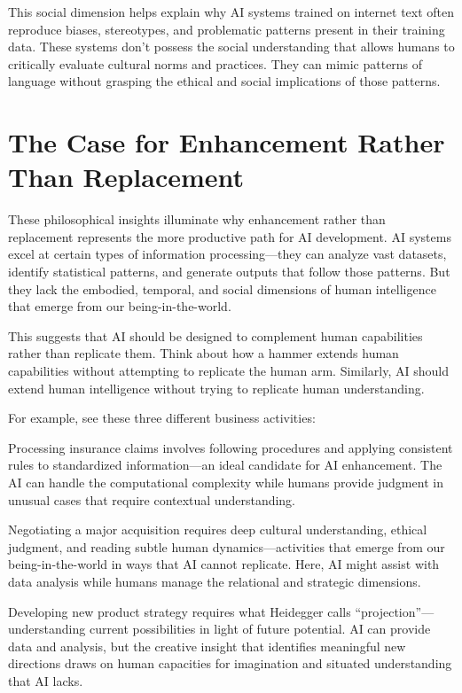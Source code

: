 \documentclass[
  Letterpaper,
]{scrbook}
\begin{document}
This social dimension helps explain why AI systems trained on internet
text often reproduce biases, stereotypes, and problematic patterns
present in their training data. These systems don't possess the social
understanding that allows humans to critically evaluate cultural norms
and practices. They can mimic patterns of language without grasping the
ethical and social implications of those patterns.

\section{The Case for Enhancement Rather Than
Replacement}\label{the-case-for-enhancement-rather-than-replacement}

These philosophical insights illuminate why enhancement rather than
replacement represents the more productive path for AI development. AI
systems excel at certain types of information processing---they can
analyze vast datasets, identify statistical patterns, and generate
outputs that follow those patterns. But they lack the embodied,
temporal, and social dimensions of human intelligence that emerge from
our being-in-the-world.

This suggests that AI should be designed to complement human
capabilities rather than replicate them. Think about how a hammer
extends human capabilities without attempting to replicate the human
arm. Similarly, AI should extend human intelligence without trying to
replicate human understanding.

For example, see these three different business activities:

Processing insurance claims involves following procedures and applying
consistent rules to standardized information---an ideal candidate for AI
enhancement. The AI can handle the computational complexity while humans
provide judgment in unusual cases that require contextual understanding.

Negotiating a major acquisition requires deep cultural understanding,
ethical judgment, and reading subtle human dynamics---activities that
emerge from our being-in-the-world in ways that AI cannot replicate.
Here, AI might assist with data analysis while humans manage the
relational and strategic dimensions.

Developing new product strategy requires what Heidegger calls
``projection''---understanding current possibilities in light of future
potential. AI can provide data and analysis, but the creative insight
that identifies meaningful new directions draws on human capacities for
imagination and situated understanding that AI lacks.
\end{document}
